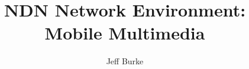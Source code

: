 \documentclass{article}
\begin{document}
\title{NDN Network Environment: Mobile Multimedia}
\author{Jeff Burke}

\maketitle













 







\newpage


\end{document}
